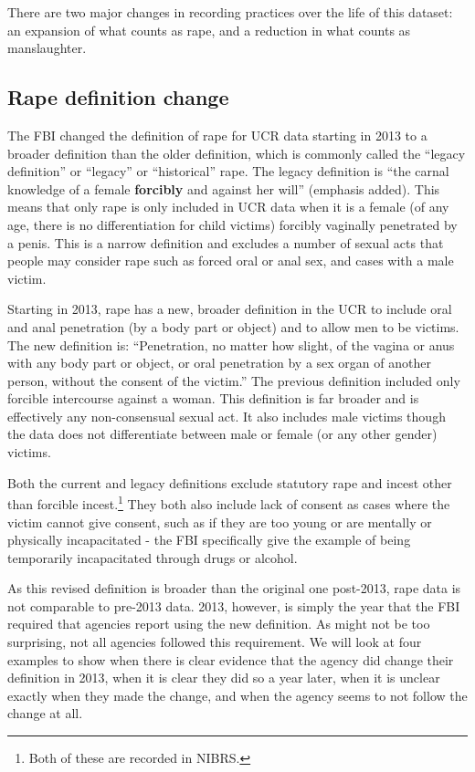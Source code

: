\documentclass[
]{krantz}
\begin{document}
There are two major changes in recording practices over the
life of this dataset: an expansion of what counts as rape,
and a reduction in what counts as manslaughter.

\subsection{Rape definition
change}\label{rape-definition-change}

The FBI changed the definition of rape for UCR data starting
in 2013 to a broader definition than the older definition,
which is commonly called the ``legacy definition'' or
``legacy'' or ``historical'' rape. The legacy definition is
``the carnal knowledge of a female \textbf{forcibly} and
against her will'' (emphasis added). This means that only
rape is only included in UCR data when it is a female (of
any age, there is no differentiation for child victims)
forcibly vaginally penetrated by a penis. This is a narrow
definition and excludes a number of sexual acts that people
may consider rape such as forced oral or anal sex, and cases
with a male victim.

Starting in 2013, rape has a new, broader definition in the
UCR to include oral and anal penetration (by a body part or
object) and to allow men to be victims. The new definition
is: ``Penetration, no matter how slight, of the vagina or
anus with any body part or object, or oral penetration by a
sex organ of another person, without the consent of the
victim.'' The previous definition included only forcible
intercourse against a woman. This definition is far broader
and is effectively any non-consensual sexual act. It also
includes male victims though the data does not differentiate
between male or female (or any other gender) victims.

Both the current and legacy definitions exclude statutory
rape and incest other than forcible incest.\footnote{Both of
  these are recorded in NIBRS.} They both also include lack
of consent as cases where the victim cannot give consent,
such as if they are too young or are mentally or physically
incapacitated - the FBI specifically give the example of
being temporarily incapacitated through drugs or alcohol.

As this revised definition is broader than the original one
post-2013, rape data is not comparable to pre-2013 data.
2013, however, is simply the year that the FBI required that
agencies report using the new definition. As might not be
too surprising, not all agencies followed this requirement.
We will look at four examples to show when there is clear
evidence that the agency did change their definition in
2013, when it is clear they did so a year later, when it is
unclear exactly when they made the change, and when the
agency seems to not follow the change at all.
\end{document}
